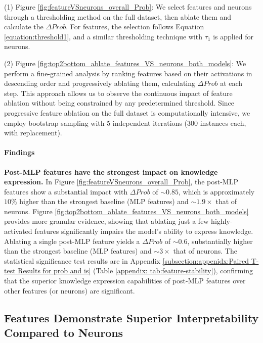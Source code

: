 (1) Figure \ref{fig:featureVSneurons_overall_Prob}: We select features and neurons through a thresholding method on the full dataset, then ablate them and calculate the $\Delta Prob$. 
For features, the selection follows Equation \ref{equation:threshold1}, and a similar thresholding technique with $\tau_1$ is applied for neurons.

(2) Figure \ref{fig:top2bottom_ablate_features_VS_neurons_both_models}: We perform a fine-grained analysis by ranking features based on their activations in descending order and progressively ablating them, calculating $\Delta Prob$ at each step. This approach allows us to observe the continuous impact of feature ablation without being constrained by any predetermined threshold. 
Since  progressive feature ablation on the full dataset is computationally intensive, we employ bootstrap sampling with 5 independent iterations (300 instances each, with replacement).

\paragraph{Findings}
\textbf{Post-MLP features have the strongest impact on knowledge expression.}
In Figure \ref{fig:featureVSneurons_overall_Prob}, the post-MLP features show a substantial impact with $\Delta Prob$ of $\sim0.85$, which is approximately $10\%$ higher than the strongest baseline (MLP features) and $\sim1.9\times$ that of neurons. Figure \ref{fig:top2bottom_ablate_features_VS_neurons_both_models} provides more granular evidence, showing that ablating just a few highly-activated features significantly impairs the model's ability to express knowledge. Ablating a single post-MLP feature yields a $\Delta Prob$ of $\sim0.6$, substantially higher than the strongest baseline (MLP features) and $\sim3\times$ that of neurons. The statistical significance test results are in Appendix \ref{subsection:appenidx:Paired T-test Results for prob and is} (Table \ref{appendix: tab:feature-stability}), confirming that the superior knowledge expression capabilities of post-MLP features over other features (or neurons) are significant.



\subsection{Features Demonstrate Superior Interpretability Compared to Neurons}

\label{subsection:Features Demonstrate Superior Interpretability Compared to Neurons}


